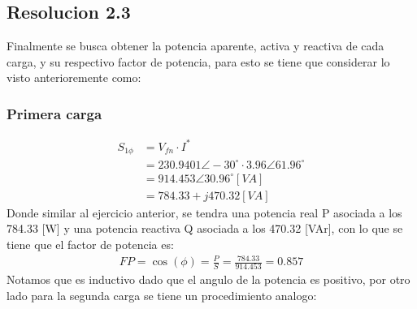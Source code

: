 \documentclass[
  11pt,
  letterpaper,
   addpoints,
  ]{exam}
\begin{document}
\begin{questions}
\begin{solution}
\subsection*{Resolucion 2.3}
Finalmente se busca obtener la potencia aparente, activa y reactiva de cada carga, y su respectivo factor de potencia, para esto se tiene que considerar lo visto anterioremente como:
\subsubsection*{Primera carga}
\begin{align}
    S_{1\phi} &= V_{fn} \cdot I^{*}\\
    &= 230.9401 \angle -30^{\circ} \cdot 3.96 \angle 61.96^{\circ}\\
    &= 914.453 \angle 30.96^{\circ} [VA]\\
    &= 784.33 + j470.32 [VA]
\end{align}
Donde similar al ejercicio anterior, se tendra una potencia real P asociada a los 784.33 [W] y una potencia reactiva Q asociada a los 470.32 [VAr], con lo que se tiene que el factor de potencia es:
\begin{align}
    FP = \cos(\phi) = \frac{P}{S} = \frac{784.33}{914.453} = 0.857
\end{align}
Notamos que es inductivo dado que el angulo de la potencia es positivo, por otro lado para la segunda carga se tiene un procedimiento analogo:

\end{solution}
\end{questions}
\end{document}
